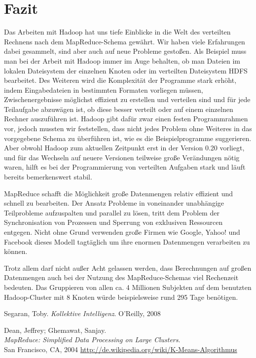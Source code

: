 \documentclass[a4paper]{llncs}
\begin{document}
\section{Fazit}
Das Arbeiten mit Hadoop hat uns tiefe Einblicke in die Welt des verteilten Rechnens nach dem MapReduce-Schema gewährt.
Wir haben viele Erfahrungen dabei gesammelt, sind aber auch auf neue Probleme gestoßen.
Als Beispiel muss man bei der Arbeit mit Hadoop immer im Auge behalten, ob man Dateien im lokalen Dateisystem der einzelnen Knoten oder im verteilten Dateisystem HDFS bearbeitet.
Des Weiteren wird die Komplexität der Programme stark erhöht, indem Eingabedateien in bestimmten Formaten vorliegen müssen, Zwischenergebnisse möglichst effizient zu erstellen und verteilen sind und für jede Teilaufgabe abzuwägen ist, ob diese besser verteilt oder auf einem einzelnen Rechner auszuführen ist.
Hadoop gibt dafür zwar einen festen Programmrahmen vor, jedoch mussten wir feststellen, dass nicht jedes Problem ohne Weiteres in das vorgegebene Schema zu überführen ist, wie es die Beispielprogramme suggerieren.
Aber obwohl Hadoop zum aktuellen Zeitpunkt erst in der Version 0.20 vorliegt, und für das Wechseln auf neuere Versionen teilweise große Verändungen nötig waren, hilft es bei der Programmierung von verteilten Aufgaben stark und läuft bereits bemerkenswert stabil.

MapReduce schafft die Möglichkeit große Datenmengen relativ effizient und schnell zu bearbeiten.
Der Ansatz Probleme in voneinander unabhängige Teilprobleme aufzuspalten und parallel zu lösen, tritt dem Problem der Synchronisation von Prozessen und Sperrung von exklusiven Ressourcen entgegen. Nicht ohne Grund verwenden große
Firmen wie Google, Yahoo! und Facebook dieses Modell tagtäglich um ihre enormen Datenmengen verarbeiten zu können.

Trotz allem darf nicht außer Acht gelassen werden, dass Berechnungen auf großen Datenmengen auch bei der Nutzung des MapReduce-Schemas viel Rechenzeit bedeuten. Das Gruppieren von allen ca. 4 Millionen Subjekten auf dem benutzten Hadoop-Cluster mit 8 Knoten würde beispielsweise rund 295 Tage benötigen.

\begin{thebibliography}{------------}

  Segaran, Toby.
  {\em Kollektive Intelligenz}.
  O'Reilly, 2008

  Dean, Jeffrey; Ghemawat, Sanjay.\\
  {\em MapReduce: Simplified Data Processing on Large Clusters}.\\
  San Francisco, CA, 2004
  \url{http://de.wikipedia.org/wiki/K-Means-Algorithmus}
  
\end{thebibliography}
\end{document}
